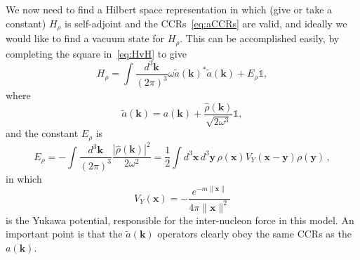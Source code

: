 \documentclass[12pt,a4paper]{article}
\newcommand{\1}{\mathds{1}}                         %
\newcommand{\kb}{{\boldsymbol{k}}}
\newcommand{\xb}{{\boldsymbol{x}}}
\newcommand{\yb}{{\boldsymbol{y}}}
\begin{document}
	We now need to find a Hilbert space representation in which (give or take a constant) $H_\rho$ is
	self-adjoint and the CCRs~\eqref{eq:aCCRs} are valid, and ideally we would
	like to find a vacuum state for $H_\rho$. This can be accomplished easily,
	by completing the square in~\eqref{eq:HvH} to give
	\begin{equation}
	H_\rho = \int\frac{d^3\kb}{(2\pi)^3} \omega \tilde{a}(\kb)^*\tilde{a}(\kb) + E_\rho\mathbb{1},
	\end{equation}
	where
	\begin{equation}\label{eq:atilde}
	\tilde{a}(\kb) = a(\kb) + \frac{\hat{\rho}(\kb)}{\sqrt{2\omega^3}}\mathbb{1},
	\end{equation}
	and the constant $E_\rho$ is
	\begin{equation}
	E_\rho= -\int\frac{d^3\kb}{(2\pi)^3} \frac{|\hat{\rho}(\kb)|^2}{2\omega^2} = \frac{1}{2}\int d^3\xb\, d^3\yb\,\rho(\xb) V_Y(\xb-\yb)\rho(\yb) \,, 
	\end{equation} 
	in which 
	\[
	V_Y(\xb)=-\frac{e^{-m\|\xb\|}}{4\pi\|\xb\|^2}
	\]
	is the Yukawa potential, responsible for the inter-nucleon force in this model. An important point is that the $\tilde{a}(\kb)$ operators clearly obey
	the same CCRs as the $a(\kb)$.
	
\end{document}
